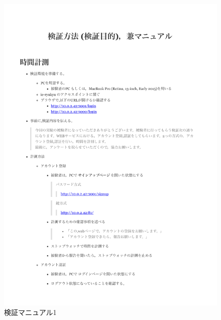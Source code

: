  \vspace{4cm}%
 \begin{figure}[H]
     \includegraphics[width=15cm]{./fig/chapter4/inspect_1/manual/manual_1.pdf}
     \caption{検証マニュアル1}
     \label{検証マニュアル１}
 \end{figure}

